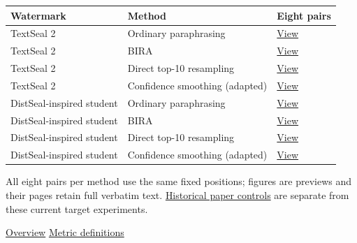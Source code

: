 {\scriptsize\setlength{\tabcolsep}{3pt} %
\begin{longtable}[]{@{}
  >{\raggedright\arraybackslash}p{}
  >{\raggedright\arraybackslash}p{}
  >{\raggedright\arraybackslash}p{}@{}}
\toprule\noalign{}
\begin{minipage}[b]{\linewidth}\raggedright
Watermark
\end{minipage} & \begin{minipage}[b]{\linewidth}\raggedright
Method
\end{minipage} & \begin{minipage}[b]{\linewidth}\raggedright
Eight pairs
\end{minipage} \\
\midrule\noalign{}
\endhead
\bottomrule\noalign{}
\endlastfoot
TextSeal 2 & Ordinary paraphrasing &
\href{records/docs/watermarking/qualitative/text-textseal2-vanilla.tex}{View} \\
TextSeal 2 & BIRA &
\href{records/docs/watermarking/qualitative/text-textseal2-bira.tex}{View} \\
TextSeal 2 & Direct top-10 resampling &
\href{records/docs/watermarking/qualitative/text-textseal2-direct_topk.tex}{View} \\
TextSeal 2 & Confidence smoothing (adapted) &
\href{records/docs/watermarking/qualitative/text-textseal2-smoothing.tex}{View} \\
DistSeal-inspired student & Ordinary paraphrasing &
\href{records/docs/watermarking/qualitative/text-latent-vanilla.tex}{View} \\
DistSeal-inspired student & BIRA &
\href{records/docs/watermarking/qualitative/text-latent-bira.tex}{View} \\
DistSeal-inspired student & Direct top-10 resampling &
\href{records/docs/watermarking/qualitative/text-latent-direct_topk.tex}{View} \\
DistSeal-inspired student & Confidence smoothing (adapted) &
\href{records/docs/watermarking/qualitative/text-latent-smoothing.tex}{View} \\
\end{longtable}
}

All eight pairs per method use the same fixed positions; figures are
previews and their pages retain full verbatim text.
\href{records/docs/watermarking/historical.tex}{Historical paper
controls} are separate from these current target experiments.

\href{../docs/watermarking/README.md}{Overview} \textbar{}
\href{records/docs/watermarking/metrics.tex}{Metric definitions}
